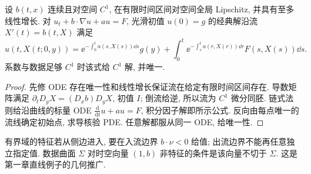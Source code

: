 \label{ch:transport}
\begin{theorem}\label{thm:transport}
设 $b(t,x)$ 连续且对空间 $C^1$, 在有限时间区间对空间全局 Lipschitz, 并具有至多线性增长. 对 $u_t+b\cdot\nabla u+a u=F$, 光滑初值 $u(0)=g$ 的经典解沿流 $X'(t)=b(t,X)$ 满足
\[
u(t,X(t;0,y))=\ee^{-\int_0^ta(s,X(s))\dd s}g(y)
+\int_0^t\ee^{-\int_s^ta(r,X(r))\dd r}F(s,X(s))\dd s.
\]
系数与数据足够 $C^1$ 时该式给 $C^1$ 解, 并唯一.
\end{theorem}
\begin{proof}
先修 ODE 存在唯一性和线性增长保证流在给定有限时间区间存在. 导数矩阵满足 $\partial_tD_yX=(D_xb)D_yX$, 初值 $I$; 倒流给逆, 所以流为 $C^1$ 微分同胚. 链式法则给沿曲线的标量 ODE $\frac{\mathrm d}{\mathrm dt}u+a u=F$, 积分因子解即所示公式. 反向由每点唯一的流线确定初始点, 求导核验 PDE. 任意解都服从同一 ODE, 给唯一性.
\end{proof}
有界域的特征若从侧边进入, 要在入流边界 $b\cdot\nu<0$ 给值; 出流边界不能再任意独立指定值. 数据曲面 $\Sigma$ 对时空向量 $(1,b)$ 非特征的条件是该向量不切于 $\Sigma$. 这是第一章直线例子的几何推广.

